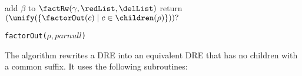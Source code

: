 \documentclass[a4paper,11pt, svgnames,titlepage]{article}
\newcommand{\rxo}{\mathtt{?}}
\DeclareMathOperator{\eqModEw}{=_{\emptyword}}
\newcommand{\emptyword}{\varepsilon}
\begin{document}
\begin{algorithm2e}[H]
{{{				{
					\lIf{$L(\unify(F))\eqModEw L(p_\gamma)$}{$\delList\leftarrow F$} %
				}
				\Else
				{
				}
				{
					{add $\beta$ to \redList}
				}
				\lIf{$(\redList\cup\delList)\neq \emptyset$}
				{$\factRw(\gamma,\redList,\delList)$}
			}
		}
		{
			return $(\unify(\{\factorOut(c)\mid c\in\children(\rho)\}))\rxo$\;
		}
	}
	\caption{\texttt{factorOut(}$\rho,parnull$\texttt{)}}
\end{algorithm2e}
The algorithm \factorOut rewrites a DRE into an equivalent DRE that has no children with a common suffix. It  uses the following subroutines:
\end{document}
